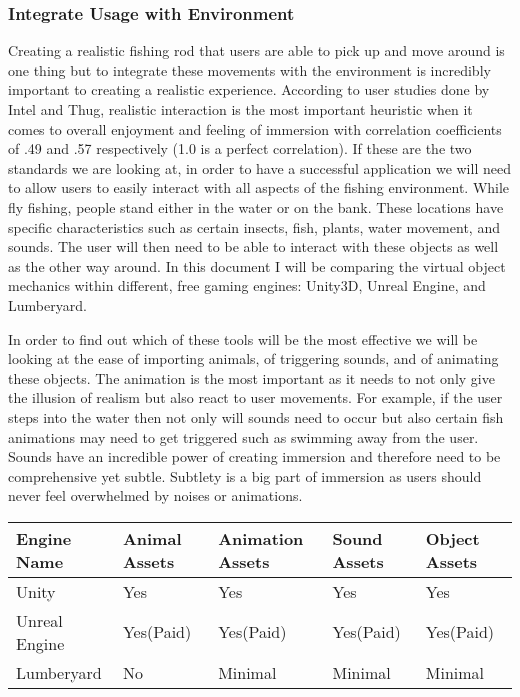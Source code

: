 \documentclass[10pt,journal,compsoc,onecolumn, draftclsnofoot]{IEEEtran}
\begin{document}
\begin{bibunit}
\subsubsection{Integrate Usage with Environment}
Creating a realistic fishing rod that users are able to pick up and move around is one thing but to integrate these movements with the environment is incredibly important to creating a realistic experience.
According to user studies done by Intel and Thug\cite{michalak_lind_round1}, realistic interaction is the most important heuristic when it comes to overall enjoyment and feeling of immersion with correlation coefficients of .49 and .57 respectively (1.0 is a perfect correlation).
If these are the two standards we are looking at, in order to have a successful application we will need to allow users to easily interact with all aspects of the fishing environment.
While fly fishing, people stand either in the water or on the bank.
These locations have specific characteristics such as certain insects, fish, plants, water movement, and sounds.
The user will then need to be able to interact with these objects as well as the other way around.
In this document I will be comparing the virtual object mechanics within different, free gaming engines: Unity3D, Unreal Engine, and Lumberyard.

In order to find out which of these tools will be the most effective we will be looking at the ease of importing animals, of triggering sounds, and of animating these objects.
The animation is the most important as it needs to not only give the illusion of realism but also react to user movements.
For example, if the user steps into the water then not only will sounds need to occur but also certain fish animations may need to get triggered such as swimming away from the user.
Sounds have an incredible power of creating immersion and therefore need to be comprehensive yet subtle.
Subtlety is a big part of immersion as users should never feel overwhelmed by noises or animations.

\vspace{2mm}
\begin{table}[h!]
\centering
  \begin{tabu} to 1.0\textwidth { | X[l] || X[c] | X[c] | X[c] | X[c] |  }
  \hline
  Engine Name & Animal Assets & Animation Assets & Sound Assets & Object Assets\\
  \hline
  Unity  & Yes & Yes & Yes & Yes\\
  Unreal Engine &   Yes(Paid) & Yes(Paid) & Yes(Paid) & Yes(Paid)\\
  Lumberyard & No & Minimal & Minimal & Minimal \\
  \hline
  \end{tabu}
\end{table}
\vspace{2mm}


\end{bibunit}
\end{document}
